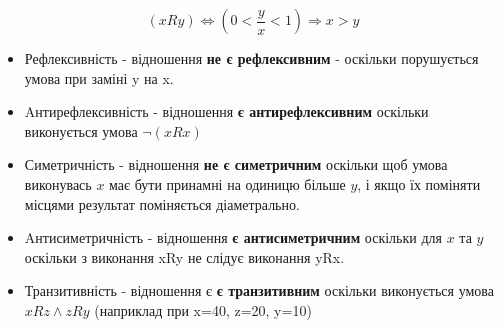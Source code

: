 \begin{center}\large{}\end{center}

  $$
  (xRy) \iff ( 0 < \dfrac{y}{x} < 1) \Rightarrow x > y
  $$




\begin{itemize}
  \item Рефлексивність - відношення \textbf{не є рефлексивним} - оскільки порушується умова при заміні y на x.
  \item Aнтирефлексивність - відношення \textbf{є антирефлексивним} оскільки виконується умова $\neg(xRx)$
  \item Симетричність - відношення \textbf{не є симетричним} оскільки щоб умова виконувась $x$ має бути принамні на одиницю більше $y$, і якщо їх поміняти місцями результат поміняється діаметрально.
  \item Aнтисиметричність - відношення \textbf{є антисиметричним} оскільки для $x$ та $y$ оскільки  з виконання xRy не слідує виконання yRx.
  \item Транзитивність - відношення є \textbf{є транзитивним} оскільки виконується умова $xRz \wedge zRy$ (наприклад при x=40, z=20, y=10)
  \end{itemize}
